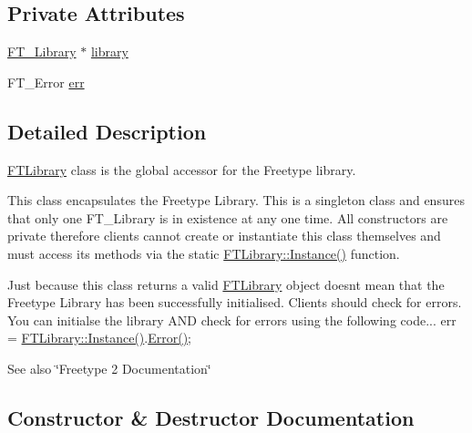 \subsection*{Private Attributes}
\begin{DoxyCompactItemize}
\item 
\hyperlink{struct_f_t___library_rec__}{F\+T\+\_\+\+Library} $\ast$ \hyperlink{class_f_t_library_af2439a94d44f3d3f0a0f124bb909e551}{library}
\item 
F\+T\+\_\+\+Error \hyperlink{class_f_t_library_abbf5dd67d4c1fd72e9292c1247f91b1e}{err}
\end{DoxyCompactItemize}


\subsection{Detailed Description}
\hyperlink{class_f_t_library}{F\+T\+Library} class is the global accessor for the Freetype library.

This class encapsulates the Freetype Library. This is a singleton class and ensures that only one F\+T\+\_\+\+Library is in existence at any one time. All constructors are private therefore clients cannot create or instantiate this class themselves and must access it\textquotesingle{}s methods via the static {\ttfamily \hyperlink{class_f_t_library_aa172665a8db8888851895bcb15aa8103}{F\+T\+Library\+::\+Instance()}} function.

Just because this class returns a valid {\ttfamily \hyperlink{class_f_t_library}{F\+T\+Library}} object doesn\textquotesingle{}t mean that the Freetype Library has been successfully initialised. Clients should check for errors. You can initialse the library A\+ND check for errors using the following code... {\ttfamily err = \hyperlink{class_f_t_library_aa172665a8db8888851895bcb15aa8103}{F\+T\+Library\+::\+Instance()}.\hyperlink{class_f_t_library_ad01e538ba8e308dddda5c4ec808ee404}{Error()};}

\begin{DoxySeeAlso}{See also}
\char`\"{}\+Freetype 2 Documentation\char`\"{} 
\end{DoxySeeAlso}


\subsection{Constructor \& Destructor Documentation}
